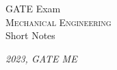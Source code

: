 \documentclass[a4paper,12pt,oneside]{book}
\begin{document}
\begin{titlepage}
\raggedright
{\Large GATE Exam\\[8cm]}
{\Huge\scshape Mechanical Engineering\\[.1in]}
{\Large Short Notes\\[1cm]}
\vfill

{\itshape 2023, GATE ME}
\end{titlepage}

\tableofcontents



\end{document}
